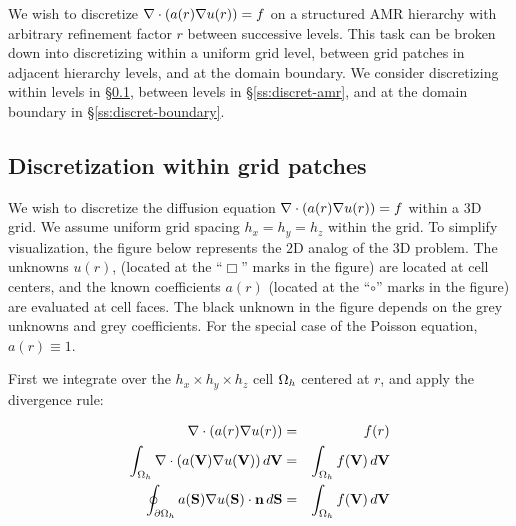 \documentclass[10pt]{article}
\begin{document}
 \newcommand{\sideXP}{\partial\Omega_H^{+x}}


We wish to discretize $\nabla\cdot(a(r) \nabla u(r)) = f$
on a structured AMR hierarchy with arbitrary refinement factor $r$
between successive levels.  This task can be broken down into
discretizing within a uniform grid level, between grid patches in
adjacent hierarchy levels, and at the domain boundary.  
We consider discretizing within levels in
\S\ref{ss:discret-unigrid}, between
levels in \S\ref{ss:discret-amr}, and at the domain boundary in
\S\ref{ss:discret-boundary}.

\subsection{Discretization within grid patches} \label{ss:discret-unigrid}

We wish to discretize the diffusion equation $\nabla\cdot(a(r) \nabla
u(r)) = f$ within a $3$D grid.  We assume uniform
grid spacing $h_{x} = h_{y} = h_{z}$ within the grid.  To simplify
visualization, the figure below represents the $2$D analog of the $3$D
problem.  The unknowns $u(r)$, (located at the ``$\Box$'' marks in the
figure) are located at cell centers, and the known coefficients $a(r)$
(located at the ``$\circ$'' marks in the figure) are evaluated at cell
faces.  The black unknown in the figure depends on the grey unknowns
and grey coefficients.  For the special case of the Poisson equation,
$a(r)\equiv 1$.

\begin{center}
\begin{minipage}{1.5in}
\end{minipage} 
\end{center}

First we integrate over the $h_x \times h_y \times h_z$ cell ${\Omega_h}$
centered at $r$, and apply the divergence rule:

 \begin{eqnarray*}
 \nabla\cdot(a(r) \nabla u(r)) & = & f(r) \\
 \int_{\Omega_h} \nabla\cdot(a(\textbf{V}) \nabla u(\textbf{V}))\, d\textbf{V} & = & \int_{\Omega_h} f(\textbf{V})\, d\textbf{V} \\
 \oint_{\partial{\Omega_h}} a(\textbf{S}) \nabla u(\textbf{S})\cdot \textbf{n} \, d\textbf{S} & = & \int_{\Omega_h} f(\textbf{V})\, d\textbf{V}
 \end{eqnarray*}
\end{document}
